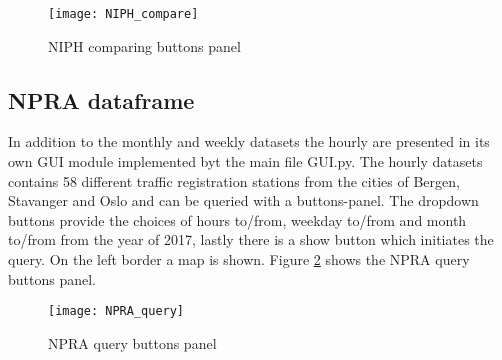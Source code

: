 \begin{figure}[ht]
\texttt{[image: NIPH\_compare]}
\centering
\caption{NIPH comparing buttons panel}
\label{fig:NIPH_compare}
\end{figure}

\subsection{NPRA dataframe}
In addition to the monthly and weekly datasets the hourly are presented in its own GUI module implemented byt the main file GUI.py. The hourly datasets contains 58 different traffic registration stations from the cities of Bergen, Stavanger and Oslo and can be queried with a buttons-panel. The dropdown buttons provide the choices of hours to/from, weekday to/from and month to/from from the year of 2017, lastly there is a show button which initiates the query. On the left border a map is shown.
Figure \ref{fig:NPRA_query} shows the NPRA query buttons panel.

\begin{figure}[ht]
\texttt{[image: NPRA\_query]}
\centering
\caption{NPRA query buttons panel}
\label{fig:NPRA_query}
\end{figure}





